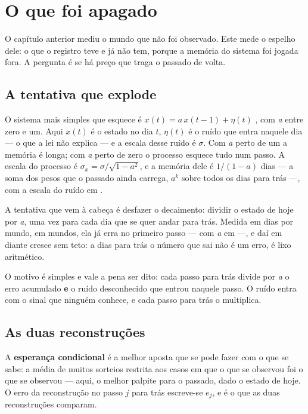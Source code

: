 \chapter{O que foi apagado}\label{cap:apagado}

O capítulo anterior mediu o mundo que não foi observado. Este mede o espelho dele: o que o registro
teve e já não tem, porque a memória do sistema foi jogada fora. A pergunta é se há preço que traga o
passado de volta.

\section{A tentativa que explode}

O sistema mais simples que esquece é $x(t) = a\,x(t-1) + \eta(t)$ \cite{box2008time}, com \emph{a} entre zero e
um. Aqui $x(t)$ é o estado no dia $t$, $\eta(t)$ é o ruído que entra naquele dia --- o que a lei não
explica --- e a escala desse ruído é $\sigma$.
Com \emph{a} perto de um a memória é longa; com \emph{a} perto de zero o processo esquece tudo num
passo. A escala do processo é $\sigma_x = \sigma/\sqrt{1-a^2}$, e a memória dele é $1/(1-a)$ dias --- a soma
dos pesos que o passado ainda carrega, $a^{k}$ sobre todos os dias para trás ---, com a escala do
ruído em \numApagadoSigma{}.

A tentativa que vem à cabeça é desfazer o decaimento: dividir o estado de hoje por \emph{a}, uma vez
para cada dia que se quer andar para trás. Medida em \numApagadoDias{} dias por mundo, em
\numApagadoSementes{} mundos, ela já erra no primeiro passo --- \numApagadoInversoNoventaCentesimos{}
com \emph{a} em \numApagadoADoTeste{} ---, e daí em diante cresce sem teto: a
\numApagadoDiasMaior{} dias para trás o número que sai não é um erro, é lixo aritmético.

O motivo é simples e vale a pena ser dito: cada passo para trás divide por \emph{a} o erro
acumulado \textbf{e} o ruído desconhecido que entrou naquele passo. O ruído entra com o sinal que ninguém conhece, e
cada passo para trás o multiplica.

\section{As duas reconstruções}

A \textbf{esperança condicional} é a melhor aposta que se pode fazer com o que se sabe: a média de
muitos sorteios restrita aos casos em que o que se observou foi o que se observou --- aqui, o melhor
palpite para o passado, dado o estado de hoje. O erro da reconstrução no passo $j$ para trás
escreve-se $e_j$, e é o que as duas reconstruções comparam.

